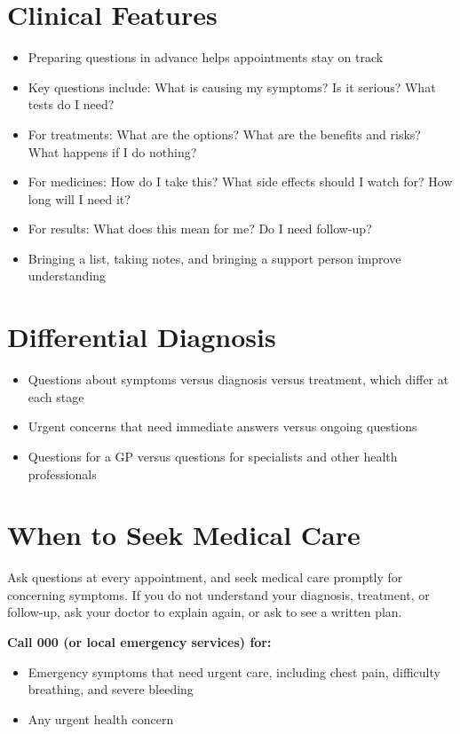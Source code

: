 \section*{Clinical Features}
\begin{itemize}
    \item Preparing questions in advance helps appointments stay on track
    \item Key questions include: What is causing my symptoms? Is it serious? What tests do I need?
    \item For treatments: What are the options? What are the benefits and risks? What happens if I do nothing?
    \item For medicines: How do I take this? What side effects should I watch for? How long will I need it?
    \item For results: What does this mean for me? Do I need follow-up?
    \item Bringing a list, taking notes, and bringing a support person improve understanding
\end{itemize}

\section*{Differential Diagnosis}
\begin{itemize}
    \item Questions about symptoms versus diagnosis versus treatment, which differ at each stage
    \item Urgent concerns that need immediate answers versus ongoing questions
    \item Questions for a GP versus questions for specialists and other health professionals
\end{itemize}

\section*{When to Seek Medical Care}
Ask questions at every appointment, and seek medical care promptly for concerning symptoms. If you do not understand your diagnosis, treatment, or follow-up, ask your doctor to explain again, or ask to see a written plan.

\textbf{Call 000 (or local emergency services) for:}
\begin{itemize}
    \item Emergency symptoms that need urgent care, including chest pain, difficulty breathing, and severe bleeding
    \item Any urgent health concern
\end{itemize}

